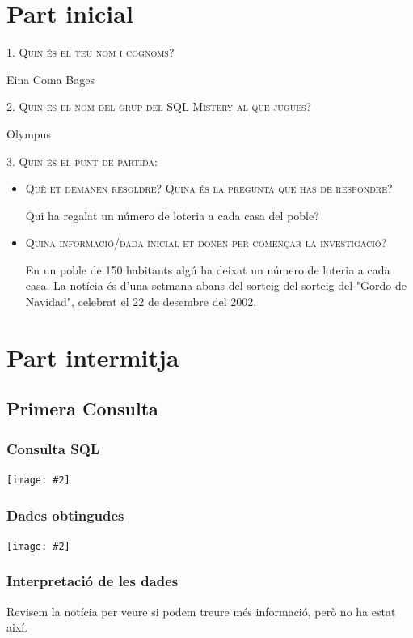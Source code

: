 \documentclass[a4paper,12pt]{article}
\newcommand{\mygraphic}[2][width=\textwidth]{\begin{center}
		\centering\texttt{[image: \#2]}\par
\end{center}}
\begin{document}

\section{Part inicial}
\textsc{1. Quin és el teu nom i cognoms?}

Eina Coma Bages

\textsc{2. Quin és el nom del grup del SQL Mistery al que jugues?}

Olympus 

\textsc{3. Quin és el punt de partida:}
\begin{itemize}
	\item \textsc{Què et demanen resoldre? Quina és la pregunta que has de respondre?}
	
	Qui ha regalat un número de loteria a cada casa del poble?	

	\item \textsc{Quina informació/dada inicial et donen per començar la investigació?}

	En un poble de 150 habitants algú ha deixat un número de loteria a cada casa. La notícia és d'una setmana abans del sorteig del sorteig del "Gordo de Navidad", celebrat el 22 de desembre del 2002.

\end{itemize}

\newpage
\section{Part intermitja}

\subsection{Primera Consulta}

\subsubsection{Consulta SQL}
\mygraphic{imatges/1.png}

\subsubsection{Dades obtingudes}
\mygraphic{imatges/2.png}

\subsubsection{Interpretació de les dades}
Revisem la notícia per veure si podem treure més informació, però no ha estat així.
\end{document}
